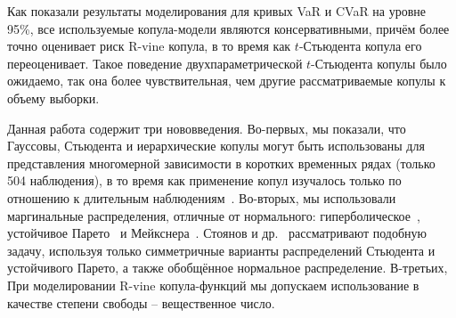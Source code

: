 Как показали результаты моделирования для кривых VaR и CVaR на уровне 95\%, все используемые копула-модели являются консервативными, причём более точно оценивает риск R-vine копула, в то время как $t$-Стьюдента копула его переоценивает. 
Такое поведение двухпараметрической $t$-Стьюдента копулы было ожидаемо, так она более чувствительная, чем другие рассматриваемые копулы к объему выборки.    

Данная работа содержит три нововведения. 
Во-первых, мы показали, что Гауссовы, Стьюдента и иерархические копулы могут быть использованы для представления многомерной зависимости в коротких временных рядах (только 504 наблюдения), в то время как применение копул изучалось только по отношению к длительным наблюдениям~\cite{Dissmann2013, Kole2007, Lourme2016}.
Во-вторых, мы использовали маргинальные распределения, отличные от нормального: гиперболическое~\cite{Barndoff1983}, устойчивое Парето~\cite{Rachev2005} и Мейкснера~\cite{Schoutens2002}. Стоянов и др.~\cite{Stoyanov2013} рассматривают подобную задачу, используя только симметричные варианты распределений Стьюдента и устойчивого Парето, а также обобщённое нормальное распределение. 
В-третьих, 
При моделировании R-vine копула-функций мы допускаем использование в качестве  степени свободы -- вещественное число. 



